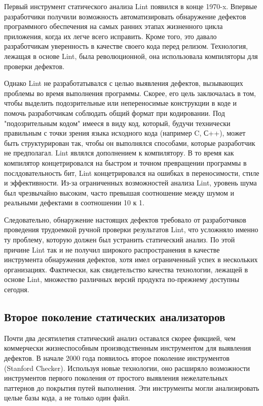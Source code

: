 Первый инструмент статического анализа Lint появился в конце 1970-x. Впервые разработчики 
получили возможность автоматизировать обнаружение дефектов программного обеспечения на самых 
ранних этапах жизненного цикла приложения, когда их легче всего исправить. Кроме того, это 
давало разработчикам уверенность в качестве своего кода перед релизом. Технология, лежащая в 
основе Lint, была революционной, она использовала компиляторы для проверки дефектов. 

Однако Lint не разработатывался с целью выявления дефектов, вызывающих проблемы во 
время выполнения программы. Скорее, его цель заключалась в том, чтобы выделить подозрительные 
или непереносимые конструкции в коде и помочь разработчикам соблюдать общий формат при 
кодировании. Под "подозрительным кодом" имееся в виду код, который, будучи технически правильным 
с точки зрения языка исходного кода (например C, С++), может быть структурирован так, чтобы он 
выполнялся способами, которые разработчик не предполагал. Lint являлся дополнением к компилятору. В то время как  компилятор концетрировался на быстром и точном превращении программы в послдовательность бит, Lint концетрировался на ошибках в переносимости, стиле и эффективности.
Из-за ограниченных возможностей анализа Lint, уровень шума был чрезвычайно высоким, часто превышая соотношение между шумом и реальными дефектами в соотношении 10 к 1.

Следовательно, обнаружение настоящих дефектов требовало от разработчиков проведения трудоемкой 
ручной проверки результатов Lint, что усложняло именно ту проблему, которую должен был 
устранить статический анализ. По этой причине Lint так и не получил широкого распространения в 
качестве инструмента обнаружения дефектов, хотя имел ограниченный успех в нескольких 
организациях. Фактически, как свидетельство качества технологии, лежащей в основе Lint, 
множество различных версий продукта по-прежнему доступны сегодня. %

\subsection{Второе поколение статических анализаторов}
Почти два десятилетия статический анализ оставался скорее фикцией, чем коммерчески 
жизнеспособным производственным инструментом для выявления дефектов. В начале 2000 года
появилось второе поколение инструментов (Stanford Checker). Используя новые 
технологии, оно расширяло возможности инструментов первого поколения от простого выявления 
нежелательных паттернов до покрытия путей выполнения. Эти инструменты могли анализировать 
целые базы кода, а не только один файл. 

